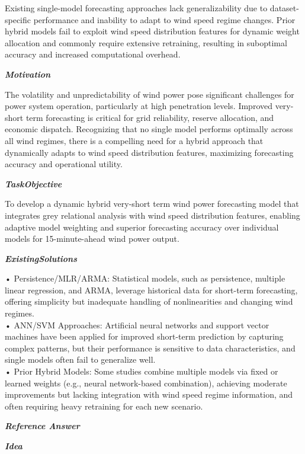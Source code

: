 \begin{tcolorbox}[
    breakable,
    title={Example of Idea Generation in Energy},
    colback=LighterGray,
    colframe=DeepPurple,
    colbacktitle=DeepPurple,
    coltitle=White,
]
Existing single-model forecasting approaches lack generalizability due to dataset-specific
performance and inability to adapt to wind speed regime changes. Prior hybrid models fail to exploit
wind speed distribution features for dynamic weight allocation and commonly require extensive
retraining, resulting in suboptimal accuracy and increased computational overhead.

\textbf{\emph{\textcolor{CaseOrange}{Motivation}}}

The volatility and unpredictability of wind power pose significant challenges for power system
operation, particularly at high penetration levels. Improved very-short term forecasting is critical
for grid reliability, reserve allocation, and economic dispatch. Recognizing that no single model
performs optimally across all wind regimes, there is a compelling need for a hybrid approach that
dynamically adapts to wind speed distribution features, maximizing forecasting accuracy and
operational utility.

\textbf{\emph{\textcolor{CaseOrange}{TaskObjective}}}

To develop a dynamic hybrid very-short term wind power forecasting model that integrates grey
relational analysis with wind speed distribution features, enabling adaptive model weighting and
superior forecasting accuracy over individual models for 15-minute-ahead wind power output.

\textbf{\emph{\textcolor{CaseOrange}{ExistingSolutions}}}

• Persistence/MLR/ARMA: Statistical models, such as persistence, multiple linear regression, and ARMA, leverage historical data for short-term forecasting, offering simplicity but inadequate handling of nonlinearities and changing wind regimes. \\
• ANN/SVM Approaches: Artificial neural networks and support vector machines have been applied for improved short-term prediction by capturing complex patterns, but their performance is sensitive to data characteristics, and single models often fail to generalize well. \\
• Prior Hybrid Models: Some studies combine multiple models via fixed or learned weights (e.g., neural network-based combination), achieving moderate improvements but lacking integration with wind speed regime information, and often requiring heavy retraining for each new scenario. 

\textbf{\emph{\textcolor{DeepPurple}{Reference Answer}}}

\textbf{\emph{\textcolor{CaseOrange}{Idea}}}


\end{tcolorbox}
